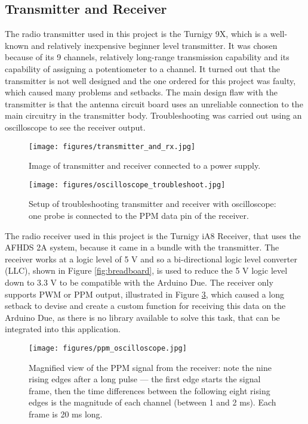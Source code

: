 \subsection*{Transmitter and Receiver} 
The radio transmitter used in this project is the Turnigy 9X, which is a well-known and relatively inexpensive beginner level transmitter. It was chosen because of its 9 channels, relatively long-range transmission capability and its capability of assigning a potentiometer to a channel. It turned out that the transmitter is not well designed and the one ordered for this project was faulty, which caused many problems and setbacks. The main design flaw with the transmitter is that the antenna circuit board uses an unreliable connection to the main circuitry in the transmitter body. Troubleshooting was carried out using an oscilloscope to see the receiver output.

\begin{figure}[htpb!]
    \centering
    \texttt{[image: figures/transmitter\_and\_rx.jpg]}
    \caption{Image of transmitter and receiver connected to a power supply.}
    \label{fig:tx_and_rx}
\end{figure}

\begin{figure}[htpb!]
    \centering
    \texttt{[image: figures/oscilloscope\_troubleshoot.jpg]}
    \caption{Setup of troubleshooting transmitter and receiver with oscilloscope: one probe is connected to the \ac{PPM} data pin of the receiver.}
    \label{fig:oscilloscope_troubleshooting}
\end{figure}

The radio receiver used in this project is the Turnigy iA8 Receiver, that uses the AFHDS 2A system, because it came in a bundle with the transmitter. The receiver works at a logic level of 5 \si{\volt} and so a bi-directional logic level converter (LLC), shown in Figure \ref{fig:breadboard}, is used to reduce the 5 \si{\volt} logic level down to 3.3 \si{\volt} to be compatible with the Arduino Due. The receiver only supports \ac{PWM} or \ac{PPM} output, illustrated in Figure \ref{fig:oscilloscope_ppm}, which caused a long setback to devise and create a custom function for receiving this data on the Arduino Due, as there is no library available to solve this task, that can be integrated into this application. 

\begin{figure}[htpb!]
    \centering
    \texttt{[image: figures/ppm\_oscilloscope.jpg]}
    \caption{Magnified view of the \ac{PPM} signal from the receiver: note the nine rising edges after a long pulse --- the first edge starts the signal frame, then the time differences between the following eight rising edges is the magnitude of each channel (between 1 and 2 \si{\milli\second}). Each frame is 20 \si{\milli\second} long.}
    \label{fig:oscilloscope_ppm}
\end{figure}

